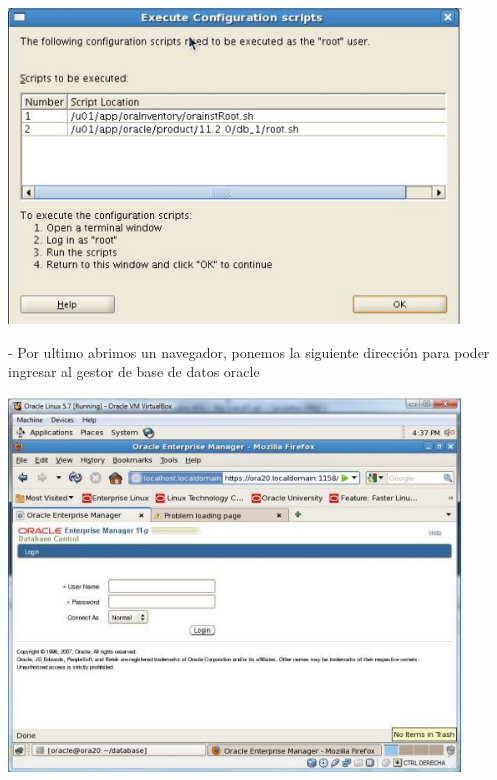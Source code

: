 \documentclass[12pt,letterpaper]{article}
\begin{document}
\begin{center}
	\includegraphics[width=12cm]{./Imagenes/51} 
\end{center}


\begin{itemize}
- Por ultimo abrimos un navegador, ponemos la siguiente dirección para poder ingresar al gestor de base de datos oracle \\
\end{itemize}

\begin{center}
	\includegraphics[width=12cm]{./Imagenes/52} 
\end{center}
\end{document}
